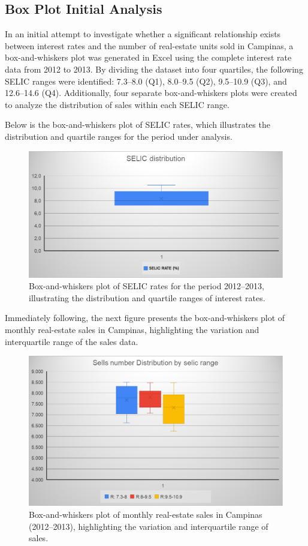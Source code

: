 \documentclass[10pt]{article}
\begin{document}
\subsection{Box Plot Initial Analysis}
In an initial attempt to investigate whether a significant relationship exists between interest rates and the number of real-estate units sold in Campinas, a box-and-whiskers plot was generated in Excel using the complete interest rate data from 2012 to 2013. By dividing the dataset into four quartiles, the following SELIC ranges were identified: 7.3--8.0 (Q1), 8.0--9.5 (Q2), 9.5--10.9 (Q3), and 12.6--14.6 (Q4). Additionally, four separate box-and-whiskers plots were created to analyze the distribution of sales within each SELIC range.

Below is the box-and-whiskers plot of SELIC rates, which illustrates the distribution and quartile ranges for the period under analysis.

\begin{figure}[H]
    \centering
    \includegraphics[width=130mm]{Fig1.png}
    \caption{Box-and-whiskers plot of SELIC rates for the period 2012--2013, illustrating the distribution and quartile ranges of interest rates.}
    \label{fig:selic_boxplot}
\end{figure}

Immediately following, the next figure presents the box-and-whiskers plot of monthly real-estate sales in Campinas, highlighting the variation and interquartile range of the sales data.

\begin{figure}[H]
    \centering
    \includegraphics[width=120mm]{Fig2.png}
    \caption{Box-and-whiskers plot of monthly real-estate sales in Campinas (2012--2013), highlighting the variation and interquartile range of sales.}
    \label{fig:sales_boxplot}
\end{figure}
\end{document}
